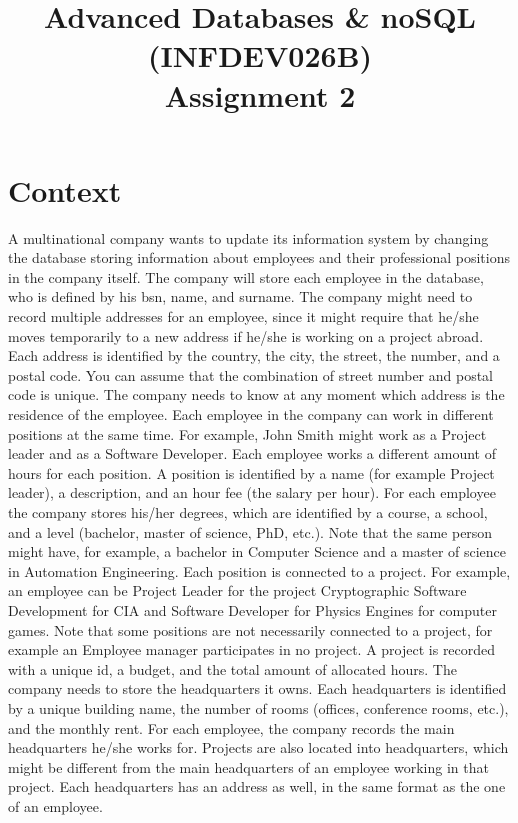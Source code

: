 \documentclass[10pt,a4paper]{article}
\title{Advanced Databases \& noSQL (INFDEV026B) \\ Assignment 2}
\author { }
\date { }
\begin{document}
\maketitle

\section*{Context}
A multinational company wants to update its information system by changing the database storing information about employees and their professional positions in the company itself. 
The company will store each employee in the database, who is defined by his bsn, name, and surname. 
The company might need to record multiple addresses for an employee, since it might require that he/she moves temporarily to a new address if he/she is working on a project abroad. Each address is identified by the country, the city, the street, the number, and a postal code. You can assume that the combination of street number and postal code is unique. The company needs to know at any moment which address is the residence of the employee.
Each employee in the company can work in different positions at the same time. For example, John Smith might work as a Project leader and as a Software Developer. Each employee works a different amount of hours for each position. A position is identified by a name (for example Project leader), a description, and an hour fee (the salary per hour).
For each employee the company stores his/her degrees, which are identified by a course, a school, and a level (bachelor, master of science, PhD, etc.). Note that the same person might have, for example, a bachelor in Computer Science and a master of science in Automation Engineering.
Each position is connected to a project. For example, an employee can be Project Leader for the project Cryptographic Software Development for CIA and Software Developer for Physics Engines for computer games. Note that some positions are not necessarily connected to a project, for example an Employee manager participates in no project. A project is recorded with a unique id, a budget, and the total amount of allocated hours.
The company needs to store the headquarters it owns. Each headquarters is identified by a unique building name, the number of rooms (offices, conference rooms, etc.), and the monthly rent. For each employee, the company records the main headquarters he/she works for. Projects are also located into headquarters, which might be different from the main headquarters of an employee working in that project. Each headquarters has an address as well, in the same format as the one of an employee.
\end{document}
